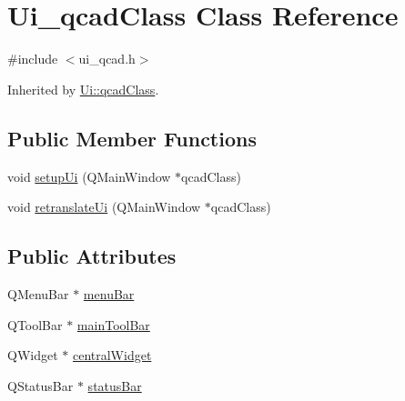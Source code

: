 \hypertarget{class_ui__qcad_class}{\section{Ui\-\_\-qcad\-Class Class Reference}
\label{class_ui__qcad_class}
}


{\ttfamily \#include $<$ui\-\_\-qcad.\-h$>$}



Inherited by \hyperlink{class_ui_1_1qcad_class}{Ui\-::qcad\-Class}.

\subsection*{Public Member Functions}
\begin{DoxyCompactItemize}
\item 
void \hyperlink{class_ui__qcad_class_a8b695580b013a984d455f80d0f6ce281}{setup\-Ui} (Q\-Main\-Window $\ast$qcad\-Class)
\item 
void \hyperlink{class_ui__qcad_class_a50cdfb95d496ef354b56743e7c18766d}{retranslate\-Ui} (Q\-Main\-Window $\ast$qcad\-Class)
\end{DoxyCompactItemize}
\subsection*{Public Attributes}
\begin{DoxyCompactItemize}
\item 
Q\-Menu\-Bar $\ast$ \hyperlink{class_ui__qcad_class_a2e3dbba7861a6c972639e10fe3c0cb57}{menu\-Bar}
\item 
Q\-Tool\-Bar $\ast$ \hyperlink{class_ui__qcad_class_abf54d7057f9aeae67ba888383f43d09f}{main\-Tool\-Bar}
\item 
Q\-Widget $\ast$ \hyperlink{class_ui__qcad_class_a6a62e5987d2a5f0886442c66b7692490}{central\-Widget}
\item 
Q\-Status\-Bar $\ast$ \hyperlink{class_ui__qcad_class_a68bc3eaf99074a517c853449518a3f84}{status\-Bar}
\end{DoxyCompactItemize}


